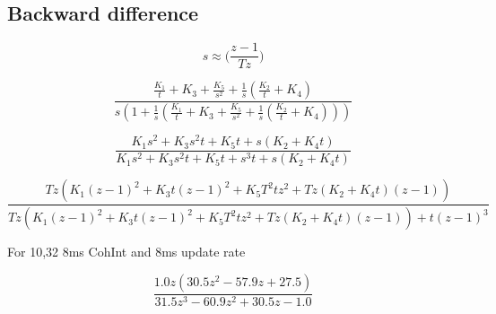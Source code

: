 \subsection{Backward difference}

\begin{equation}
s \approx \Big(\frac{z-1}{Tz}\Big)
\end{equation}

\begin{comment}
\begin{equation}
 H(s) = \frac{s^2(K1) + s(K2) + K3}
 {s^3+ s^2(K1)+ s(K2) + K3}
\end{equation}

\begin{equation}
 H(s) = \frac{\Big(\frac{z-1}{Tz}\Big)^2(K1) + \Big(\frac{z-1}{Tz}\Big)(K2) + K3}{\Big(\frac{z-1}{Tz}\Big)^3+ \Big(\frac{z-1}{Tz}\Big)^2(K1)+ \Big(\frac{z-1}{Tz}\Big)(K2) + K3}
\end{equation}
\end{comment}

\begin{equation}
\frac{\frac{K_{1}}{t} + K_{3} + \frac{K_{5}}{s^{2}} + \frac{1}{s} \left(\frac{K_{2}}{t} + K_{4}\right)}{s \left(1 + \frac{1}{s} \left(\frac{K_{1}}{t} + K_{3} + \frac{K_{5}}{s^{2}} + \frac{1}{s} \left(\frac{K_{2}}{t} + K_{4}\right)\right)\right)}
\end{equation}

\begin{equation}
\frac{K_{1} s^{2} + K_{3} s^{2} t + K_{5} t + s \left(K_{2} + K_{4} t\right)}{K_{1} s^{2} + K_{3} s^{2} t + K_{5} t + s^{3} t + s \left(K_{2} + K_{4} t\right)}
\end{equation}

\begin{equation}
\frac{T z \left(K_{1} \left(z - 1\right)^{2} + K_{3} t \left(z - 1\right)^{2} + K_{5} T^{2} t z^{2} + T z \left(K_{2} + K_{4} t\right) \left(z - 1\right)\right)}{T z \left(K_{1} \left(z - 1\right)^{2} + K_{3} t \left(z - 1\right)^{2} + K_{5} T^{2} t z^{2} + T z \left(K_{2} + K_{4} t\right) \left(z - 1\right)\right) + t \left(z - 1\right)^{3}}
\end{equation}

For 10,32 8ms CohInt and 8ms update rate

\begin{equation}
\frac{1.0 z \left(30.5 z^{2} - 57.9 z + 27.5\right)}{31.5 z^{3} - 60.9 z^{2} + 30.5 z - 1.0}
\end{equation}


